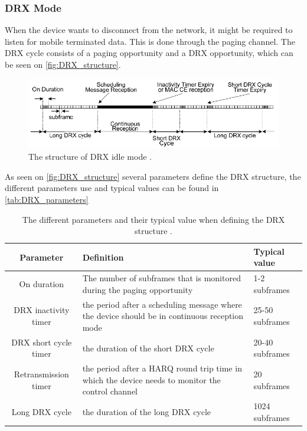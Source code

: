 \subsubsection{DRX Mode}
When the device wants to disconnect from the network, it might be required to listen for mobile terminated data. This is done through the paging channel. The DRX cycle consists of a paging opportunity and a DRX opportunity, which can be seen on \autoref{fig:DRX_structure}. 

\begin{figure}[H]
\centering
\includegraphics[width=\textwidth]{figures/DRX_structure.pdf}
\caption{The structure of \gls{DRX} idle mode \citep{book_LTE_for_UMTS2}.}
\label{fig:DRX_structure}
\end{figure}

As seen on \autoref{fig:DRX_structure} several parameters define the DRX structure, the different parameters use and typical values can be found in \autoref{tab:DRX_parameters}

\begin{table}[H]
\centering
\begin{tabular}{|c|p{6cm}|p{4cm}|} \hline
\textbf{Parameter} & \textbf{Definition} & \textbf{Typical value} \\ \hline 
On duration &  The number of subframes that is monitored during the paging opportunity & 1-2 subframes\\ \hline
DRX inactivity timer & the period after a scheduling message where the device should be in continuous reception mode & 25-50 subframes \\ \hline
DRX short cycle timer & the duration of the short DRX cycle & 20-40 subframes \\ \hline
Retransmission timer & the period after a \gls{HARQ} round trip time in which the device needs to monitor the control channel & 20  subframes \\ \hline
Long DRX cycle & the duration of the long DRX cycle & 1024 subframes \\ \hline
\end{tabular}
\caption{The different parameters and their typical value when defining the DRX structure \citep{book_LTE_for_UMTS}.}
\label{tab:DRX_parameters}
\end{table}

